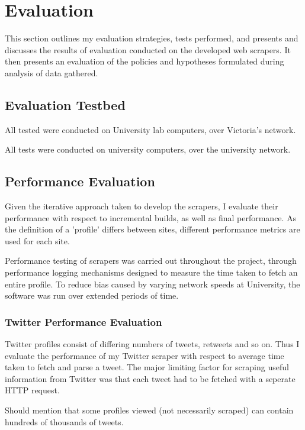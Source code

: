 \chapter{Evaluation}\label{C:us}

This section outlines my evaluation strategies, tests performed, and presents and discusses the results of evaluation conducted on the developed web scrapers. It then presents an evaluation of the policies and hypotheses formulated during analysis of data gathered. 

\section{Evaluation Testbed}

All tested were conducted on University lab computers, over Victoria's network. 

All tests were conducted on university computers, over the university network. %

\section{Performance Evaluation}

Given the iterative approach taken to develop the scrapers, I evaluate their performance with respect to incremental builds, as well as final performance. As the definition of a 'profile' differs between sites, different performance metrics are used for each site. 

Performance testing of scrapers was carried out throughout the project, through performance logging mechanisms designed to measure the time taken to fetch an entire profile. To reduce bias caused by varying network speeds at University, the software was run over extended periods of time.

\subsection{Twitter Performance Evaluation}

Twitter profiles consist of differing numbers of tweets, retweets and so on. Thus I evaluate the performance of my Twitter scraper with respect to average time taken to fetch and parse a tweet. The major limiting factor for scraping useful information from Twitter was that each tweet had to be fetched with a seperate HTTP request. 

Should mention that some profiles viewed (not necessarily scraped) can contain hundreds of thousands of tweets.

